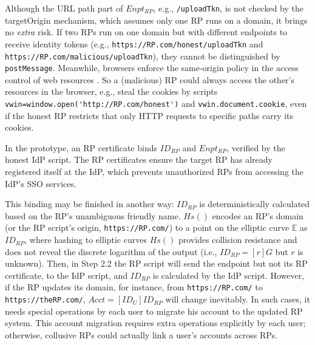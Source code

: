 Although the URL path part of $Enpt_{RP}$, e.g., \verb+/uploadTkn+,
 is not checked by the targetOrigin mechanism,
  which assumes only one RP runs on a domain,
   it brings no \emph{extra} risk.
If two RPs run on one domain but with different endpoints to receive identity tokens
        (e.g., \verb+https://RP.com/honest/uploadTkn+ and \verb+https://RP.com/malicious/uploadTkn+),
         they cannot be distinguished by \verb+postMessage+.
Meanwhile, browsers enforce
 the same-origin policy  in the access control of web resources \cite{sop}.
So
    a (malicious) RP could always access the other's resources in the browser,
        e.g., steal the cookies
        by scripts
        \verb+vwin=window.open('http://RP.com/honest')+
    and \verb+vwin.document.cookie+,
    even if the honest RP restricts that only HTTP requests to specific paths carry its cookies.


\vspace{0.5mm}
In the prototype, an RP certificate binds $ID_{RP}$ and $Enpt_{RP}$,
    verified by the honest IdP script.
The RP certificates ensure the target RP has already registered itself at the IdP,
 which prevents unauthorized RPs from accessing the IdP's SSO services.

This binding may be finished in another way:
    $ID_{RP}$ is deterministically calculated based on the RP's unambiguous friendly name.
$Hs()$ encodes an RP's domain (or the RP script's origin, \verb+https://RP.com/+) to a point on the elliptic curve $\mathbb{E}$ as $ID_{RP}$,
where
    hashing to elliptic curves $Hs()$ \cite{irtf-cfrg-hash-to-curve-16} provides collision resistance and does not reveal the discrete logarithm of the output
    (i.e., $ID_{RP} = [r]G$ but $r$ is unknown).
Then,  in Step 2.2 the RP script will send the endpoint but not its RP certificate,
to the IdP script,
 and $ID_{RP}$ is calculated by the IdP script.
However, if the RP updates its domain, for instance, from \verb+https://RP.com/+ to \verb+https://theRP.com/+,
$Acct = [ID_U]ID_{RP}$ will change inevitably.
In such cases,
    it needs special operations by each user to migrate his account
            to the updated RP system.
This account migration requires extra operations explicitly by each user;
    otherwise,
        collusive RPs could actually link a user's accounts across RPs.


